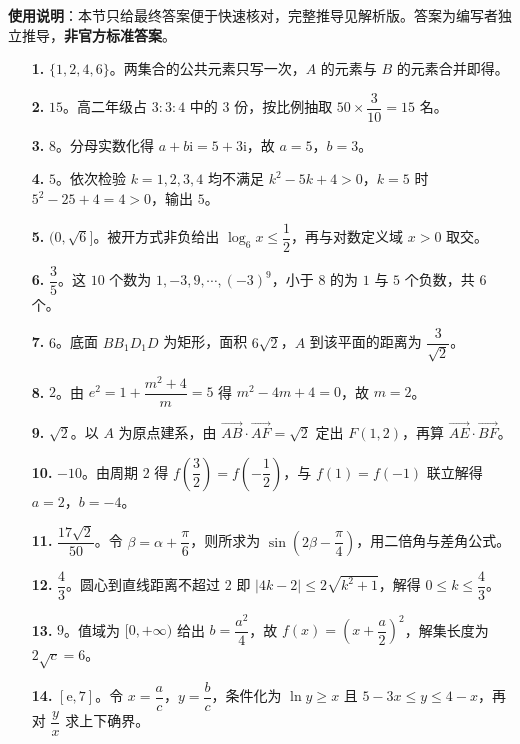 
\begin{gknotice}
\textbf{使用说明}：本节只给最终答案便于快速核对，完整推导见解析版。答案为编写者独立推导，\textbf{非官方标准答案}。
\end{gknotice}

\begin{itemize}[leftmargin=2.6em]
  \item[\textbf{1.}] $\{1,2,4,6\}$。两集合的公共元素只写一次，$A$ 的元素与 $B$ 的元素合并即得。
  \item[\textbf{2.}] $15$。高二年级占 $3:3:4$ 中的 $3$ 份，按比例抽取 $50\times\dfrac3{10}=15$ 名。
  \item[\textbf{3.}] $8$。分母实数化得 $a+b\mathrm i=5+3\mathrm i$，故 $a=5$，$b=3$。
  \item[\textbf{4.}] $5$。依次检验 $k=1,2,3,4$ 均不满足 $k^2-5k+4>0$，$k=5$ 时 $5^2-25+4=4>0$，输出 $5$。
  \item[\textbf{5.}] $(0,\sqrt6]$。被开方式非负给出 $\log_6x\leqslant\dfrac12$，再与对数定义域 $x>0$ 取交。
  \item[\textbf{6.}] $\dfrac35$。这 $10$ 个数为 $1,-3,9,\cdots,(-3)^9$，小于 $8$ 的为 $1$ 与 $5$ 个负数，共 $6$ 个。
  \item[\textbf{7.}] $6$。底面 $BB_1D_1D$ 为矩形，面积 $6\sqrt2$，$A$ 到该平面的距离为 $\dfrac{3}{\sqrt2}$。
  \item[\textbf{8.}] $2$。由 $e^2=1+\dfrac{m^2+4}{m}=5$ 得 $m^2-4m+4=0$，故 $m=2$。
  \item[\textbf{9.}] $\sqrt2$。以 $A$ 为原点建系，由 $\overrightarrow{AB}\cdot\overrightarrow{AF}=\sqrt2$ 定出 $F(1,2)$，再算 $\overrightarrow{AE}\cdot\overrightarrow{BF}$。
  \item[\textbf{10.}] $-10$。由周期 $2$ 得 $f\left(\dfrac32\right)=f\left(-\dfrac12\right)$，与 $f(1)=f(-1)$ 联立解得 $a=2$，$b=-4$。
  \item[\textbf{11.}] $\dfrac{17\sqrt2}{50}$。令 $\beta=\alpha+\dfrac\pi6$，则所求为 $\sin\left(2\beta-\dfrac\pi4\right)$，用二倍角与差角公式。
  \item[\textbf{12.}] $\dfrac43$。圆心到直线距离不超过 $2$ 即 $|4k-2|\leqslant2\sqrt{k^2+1}$，解得 $0\leqslant k\leqslant\dfrac43$。
  \item[\textbf{13.}] $9$。值域为 $[0,+\infty)$ 给出 $b=\dfrac{a^2}4$，故 $f(x)=\left(x+\dfrac a2\right)^2$，解集长度为 $2\sqrt c=6$。
  \item[\textbf{14.}] $[\mathrm e,7]$。令 $x=\dfrac ac$，$y=\dfrac bc$，条件化为 $\ln y\geqslant x$ 且 $5-3x\leqslant y\leqslant4-x$，再对 $\dfrac yx$ 求上下确界。
\end{itemize}

